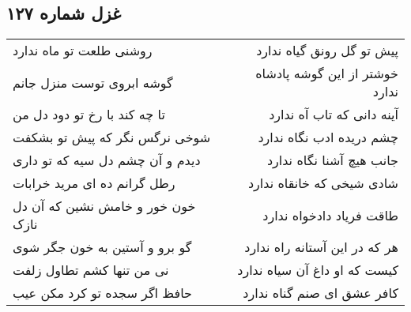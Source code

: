 \begin{center}
\section*{غزل شماره ۱۲۷}
\label{sec:sh127}
\begin{longtable}{l p{0.5cm} r}
روشنی طلعت تو ماه ندارد
&&
پیش تو گل رونق گیاه ندارد
\\
گوشه ابروی توست منزل جانم
&&
خوشتر از این گوشه پادشاه ندارد
\\
تا چه کند با رخ تو دود دل من
&&
آینه دانی که تاب آه ندارد
\\
شوخی نرگس نگر که پیش تو بشکفت
&&
چشم دریده ادب نگاه ندارد
\\
دیدم و آن چشم دل سیه که تو داری
&&
جانب هیچ آشنا نگاه ندارد
\\
رطل گرانم ده ای مرید خرابات
&&
شادی شیخی که خانقاه ندارد
\\
خون خور و خامش نشین که آن دل نازک
&&
طاقت فریاد دادخواه ندارد
\\
گو برو و آستین به خون جگر شوی
&&
هر که در این آستانه راه ندارد
\\
نی من تنها کشم تطاول زلفت
&&
کیست که او داغ آن سیاه ندارد
\\
حافظ اگر سجده تو کرد مکن عیب
&&
کافر عشق ای صنم گناه ندارد
\\
\end{longtable}
\end{center}
